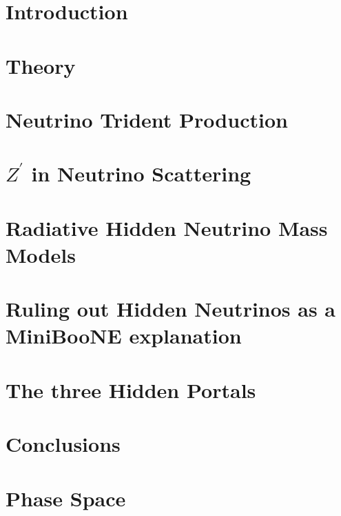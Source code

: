 \documentclass[twoside,openright,frontopenright]{ip3thesis}
\begin{document}
\chapter{Introduction}


\chapter{Theory}


\chapter{Neutrino Trident Production}


\chapter{$Z^\prime$ in Neutrino Scattering}


\chapter{Radiative Hidden Neutrino Mass Models}


\chapter{Ruling out Hidden Neutrinos as a MiniBooNE explanation}


\chapter{The three Hidden Portals}


\chapter{Conclusions}


\appendix
\chapter{Phase Space}





\end{document}
